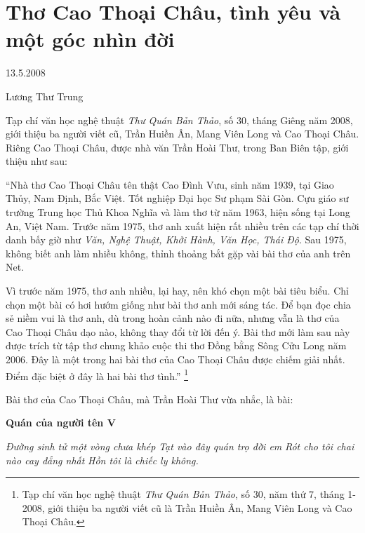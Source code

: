 \documentclass[../main.tex]{subfiles}
\begin{document}
\chapter{Thơ Cao Thoại Châu, tình yêu và một góc nhìn đời}

\begin{metadata}

\begin{flushright}13.5.2008\end{flushright}

Lương Thư Trung



\end{metadata}

\begin{multicols}{2}

Tạp chí văn học nghệ thuật \textit{Thư Quán Bản Thảo}, số 30, tháng Giêng năm 2008, giới thiệu ba người viết cũ, Trần Huiền Ân, Mang Viên Long và Cao Thoại Châu. Riêng Cao Thoại Châu, được nhà văn Trần Hoài Thư, trong Ban Biên tập, giới thiệu như sau: 
 
“Nhà thơ Cao Thoại Châu tên thật Cao Đình Vưu, sinh năm 1939, tại Giao Thủy, Nam Định, Bắc Việt. Tốt nghiệp Đại học Sư phạm Sài Gòn. Cựu giáo sư trường Trung học Thủ Khoa Nghĩa và làm thơ từ năm 1963, hiện sống tại Long An, Việt Nam. Trước năm 1975, thơ anh xuất hiện rất nhiều trên các tạp chí thời danh bấy giờ như \textit{Văn, Nghệ Thuật, Khởi Hành, Văn Học, Thái Độ}. Sau 1975, không biết anh làm nhiều không, thỉnh thoảng bắt gặp vài bài thơ của anh trên Net. 
 
Vì trước năm 1975, thơ anh nhiều, lại hay, nên khó chọn một bài tiêu biểu. Chỉ chọn một bài có hơi hướm giống như bài thơ anh mới sáng tác. Để bạn đọc chia sẻ niềm vui là thơ anh, dù trong hoàn cảnh nào đi nữa, nhưng vẫn là thơ của Cao Thoại Châu dạo nào, không thay đổi từ lời đến ý. Bài thơ mới làm sau này được trích từ tập thơ chung khảo cuộc thi thơ Đồng bằng Sông Cửu Long năm 2006. Đây là một trong hai bài thơ của Cao Thoại Châu được chiếm giải nhất. Điểm đặc biệt ở đây là hai bài thơ tình.” \footnote{
Tạp chí văn học nghệ thuật \textit{Thư Quán Bản Thảo}, số 30, năm thứ 7, tháng 1-2008, giới thiệu ba người viết cũ là Trần Huiền Ân, Mang Viên Long và Cao Thoại Châu.}  
 
Bài thơ của Cao Thoại Châu, mà Trần Hoài Thư vừa nhắc, là bài: 
\begin{blockquote}
 
\textbf{Quán của người tên V} 
        
\textit{Đường sinh tử một vòng chưa khép}        
\textit{Tạt vào đây quán trọ đời em}        
\textit{Rót cho tôi chai nào cay đắng nhất} 
\textit{Hồn tôi là chiếc ly không.} 
        

\end{blockquote}
\end{multicols}
\end{document}

